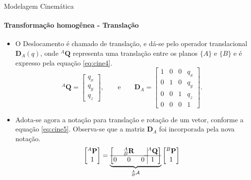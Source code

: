 \documentclass{beamer}
\begin{document}
\begin{frame}{Modelagem Cinemática}
    \framesubtitle{Transformação homogênea - Translação}
    \begin{itemize}
        \item O Deslocamento é chamado de translação, e dá-se pelo operador translacional $\mathbf{D}_A(q)$, onde ${}^A\mathbf{Q}$ representa uma translação entre os planos $\{A\}$ e $\{B\}$ e é expresso pela equação \eqref{eq:cine4}.
              \begin{equation}\label{eq:cine4}
                  {}^A\mathbf{Q} =
                  \begin{bmatrix}
                      q_x \\ q_y \\ q_z
                  \end{bmatrix}, \qquad \mathrm{e} \qquad
                  \mathbf{D}_A =
                  \begin{bmatrix}
                      1 & 0 & 0 & q_x \\
                      0 & 1 & 0 & q_y \\
                      0 & 0 & 1 & q_z \\
                      0 & 0 & 0 & 1
                  \end{bmatrix}.
              \end{equation}
        \item Adota-se agora a notação para translação e rotação de um vetor, conforme a equação \eqref{eq:cine5}. Observa-se que a matriz $\mathbf{D}_A$ foi incorporada pela nova notação.
              \begin{equation}\label{eq:cine5}
                  \begin{bmatrix}
                      {}^A\mathbf{P} \\ 1
                  \end{bmatrix}
                  =
                  \underbrace {
                      \left[
                          \begin{matrix}
                                & {}_B^A\mathbf{R} &   \\ \hline
                              0 & 0                & 0 \\
                          \end{matrix} \right.
                          \left.
                          \vline
                          \begin{matrix}
                              {}^A\mathbf{Q} \\ \hline
                              1
                          \end{matrix} \right]
                  }_{{}^A_B\mathcal{A}}
                  \begin{bmatrix}
                      {}^B\mathbf{P} \\
                      1
                  \end{bmatrix}
              \end{equation}
    \end{itemize}
\end{frame}
\end{document}
